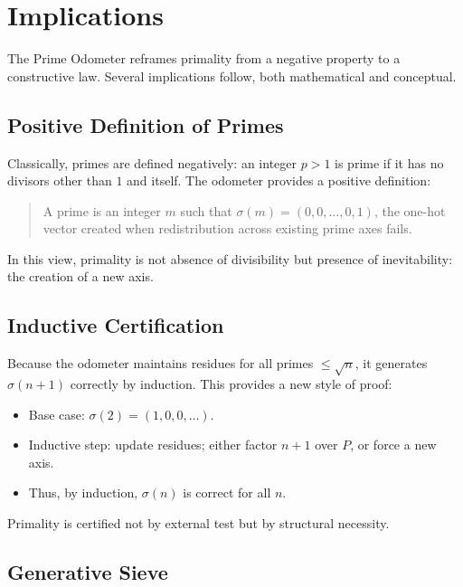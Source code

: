 \documentclass[12pt]{article}
\theoremstyle{definition}
\theoremstyle{remark}
\begin{document}

\section{Implications}

The Prime Odometer reframes primality from a negative property to a constructive law. Several
implications follow, both mathematical and conceptual.

\subsection{Positive Definition of Primes}

Classically, primes are defined negatively: an integer $p > 1$ is prime if it has no divisors other
than $1$ and itself. The odometer provides a positive definition:

\begin{quote}
A prime is an integer $m$ such that $\sigma(m) = (0,0,\dots,0,1)$, the one-hot vector created
when redistribution across existing prime axes fails.
\end{quote}

In this view, primality is not absence of divisibility but presence of inevitability: the creation of
a new axis.

\subsection{Inductive Certification}

Because the odometer maintains residues for all primes $\leq \sqrt{n}$, it generates $\sigma(n+1)$
correctly by induction. This provides a new style of proof:

\begin{itemize}
  \item Base case: $\sigma(2) = (1,0,0,\dots)$.
  \item Inductive step: update residues; either factor $n+1$ over $P$, or force a new axis.
  \item Thus, by induction, $\sigma(n)$ is correct for all $n$.
\end{itemize}

Primality is certified not by external test but by structural necessity.

\subsection{Generative Sieve}
\end{document}
